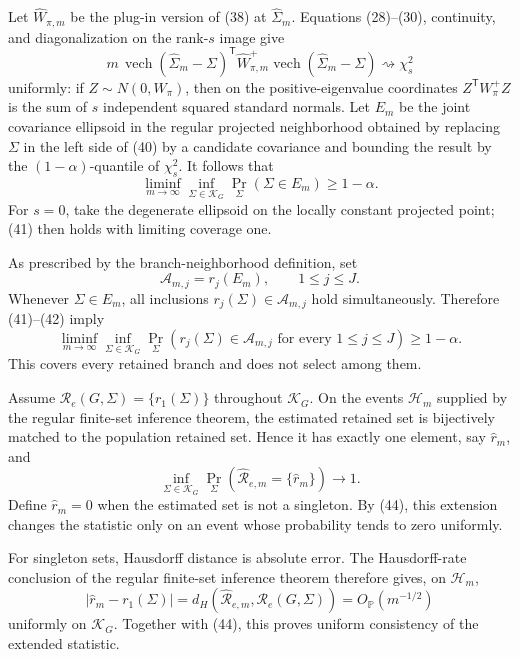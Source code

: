 Let \(\widehat W_{\pi,m}\) be the plug-in version of (38) at \(\widehat\Sigma_m\).  Equations (28)--(30), continuity, and diagonalization on the rank-\(s\) image give
\[
 m\,\operatorname{vech}(\widehat\Sigma_m-\Sigma)^{\mathsf T}
 \widehat W_{\pi,m}^{+}
 \operatorname{vech}(\widehat\Sigma_m-\Sigma)
 \rightsquigarrow\chi_s^2                                    \tag{40}
\]
uniformly: if \(Z\sim N(0,W_\pi)\), then on the positive-eigenvalue coordinates \(Z^{\mathsf T}W_\pi^+Z\) is the sum of \(s\) independent squared standard normals.  Let \(E_m\) be the joint covariance ellipsoid in the regular projected neighborhood obtained by replacing \(\Sigma\) in the left side of (40) by a candidate covariance and bounding the result by the \((1-\alpha)\)-quantile of \(\chi_s^2\).  It follows that
\[
 \liminf_{m\to\infty}\inf_{\Sigma\in\mathcal K_G}
 \Pr_\Sigma(\Sigma\in E_m)\geq1-\alpha.                       \tag{41}
\]
For \(s=0\), take the degenerate ellipsoid on the locally constant projected point; (41) then holds with limiting coverage one.

As prescribed by the branch-neighborhood definition, set
\[
 \mathcal A_{m,j}=r_j(E_m),\qquad 1\leq j\leq J.                \tag{42}
\]
Whenever \(\Sigma\in E_m\), all inclusions \(r_j(\Sigma)\in\mathcal A_{m,j}\) hold simultaneously.  Therefore (41)--(42) imply
\[
 \liminf_{m\to\infty}\inf_{\Sigma\in\mathcal K_G}
 \Pr_\Sigma\!\left(
   r_j(\Sigma)\in\mathcal A_{m,j}
   \text{ for every }1\leq j\leq J
 \right)\geq1-\alpha.                                         \tag{43}
\]
This covers every retained branch and does not select among them.

Assume \(\mathcal R_e(G,\Sigma)=\{r_1(\Sigma)\}\) throughout \(\mathcal K_G\).  On the events \(\mathcal H_m\) supplied by the regular finite-set inference theorem, the estimated retained set is bijectively matched to the population retained set.  Hence it has exactly one element, say \(\widehat r_m\), and
\[
 \inf_{\Sigma\in\mathcal K_G}
 \Pr_\Sigma\!\left(
   \widehat{\mathcal R}_{e,m}=\{\widehat r_m\}
 \right)\longrightarrow1.                                     \tag{44}
\]
Define \(\widehat r_m=0\) when the estimated set is not a singleton.  By (44), this extension changes the statistic only on an event whose probability tends to zero uniformly.

For singleton sets, Hausdorff distance is absolute error.  The Hausdorff-rate conclusion of the regular finite-set inference theorem therefore gives, on \(\mathcal H_m\),
\[
 |\widehat r_m-r_1(\Sigma)|
 =d_H\!\left(\widehat{\mathcal R}_{e,m},
              \mathcal R_e(G,\Sigma)\right)
 =O_{\mathbb P}(m^{-1/2})                                      \tag{45}
\]
uniformly on \(\mathcal K_G\).  Together with (44), this proves uniform consistency of the extended statistic.

